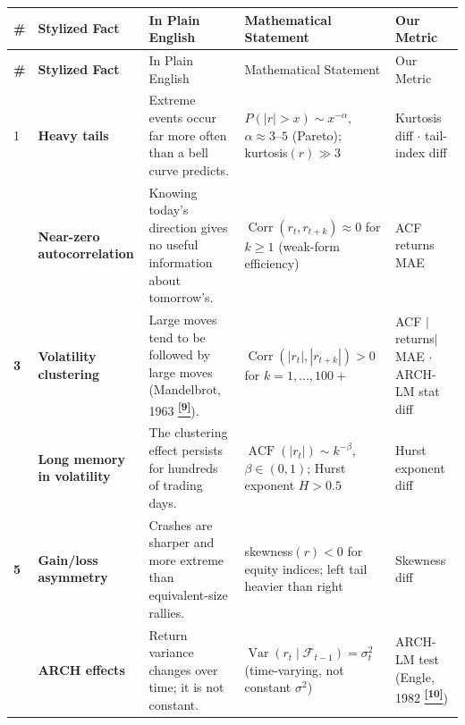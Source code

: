 \documentclass[10pt]{article}
\newcommand{\tcite}[1]{%
  \hyperlink{R:#1}{\textsuperscript{\scriptsize\textbf{[#1]}}}}
\begin{document}
\vspace{2pt}
\small
\setlength{\tabcolsep}{5pt}
\renewcommand{\arraystretch}{1.4}
\begin{longtable}{%
  >{\bfseries\centering}p{}
  >{\bfseries}p{}
  p{}
  p{}
  p{}}

\rowcolor{Navy}
{\color{white}\#} &
{\color{white}Stylized Fact} &
{\color{white}In Plain English} &
{\color{white}Mathematical Statement} &
{\color{white}Our Metric} \\[2pt]
\endfirsthead
\rowcolor{Navy}
{\color{white}\#} &
{\color{white}Stylized Fact} &
{\color{white}In Plain English} &
{\color{white}Mathematical Statement} &
{\color{white}Our Metric} \\[2pt]
\endhead

\rowcolor{TabOdd}
1 & Heavy tails &
  Extreme events occur far more often than a bell curve predicts. &
  $P(|r|>x) \sim x^{-\alpha}$, $\alpha \approx 3$--$5$ (Pareto); kurtosis$(r) \gg 3$ &
  Kurtosis diff $\cdot$ tail-index diff \\

2 & Near-zero autocorrelation &
  Knowing today's direction gives no useful information about tomorrow's. &
  $\operatorname{Corr}(r_t, r_{t+k}) \approx 0$ for $k \geq 1$ (weak-form efficiency) &
  ACF returns MAE \\

\rowcolor{TabOdd}
3 & Volatility clustering &
  Large moves tend to be followed by large moves (Mandelbrot, 1963\tcite{9}). &
  $\operatorname{Corr}(|r_t|, |r_{t+k}|) > 0$ for $k = 1, \ldots, 100{+}$ &
  ACF $|$returns$|$ MAE $\cdot$ ARCH-LM stat diff \\

4 & Long memory in volatility &
  The clustering effect persists for hundreds of trading days. &
  $\operatorname{ACF}(|r_t|) \sim k^{-\beta}$, $\beta \in (0,1)$; Hurst exponent $H > 0.5$ &
  Hurst exponent diff \\

\rowcolor{TabOdd}
5 & Gain/loss asymmetry &
  Crashes are sharper and more extreme than equivalent-size rallies. &
  skewness$(r) < 0$ for equity indices; left tail heavier than right &
  Skewness diff \\

6 & ARCH effects &
  Return variance changes over time; it is not constant. &
  $\operatorname{Var}(r_t \mid \mathcal{F}_{t-1}) = \sigma^2_t$ (time-varying, not constant $\sigma^2$) &
  ARCH-LM test (Engle, 1982\tcite{10}) \\


\end{longtable}
\end{document}
